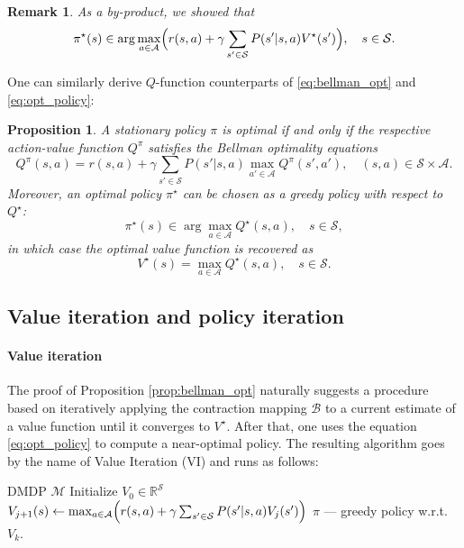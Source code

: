 \documentclass{article}
\numberwithin{equation}{section}
\newtheorem{proposition}{Proposition}
\newtheorem{remark}{Remark}
\newcommand{\cA}{\mathcal{A}}
\newcommand{\cM}{\mathcal{M}}
\newcommand{\cS}{\mathcal{S}}
\begin{document}
\begin{remark}
    As a by-product, we showed that
    \begin{equation}\label{eq:opt_policy}
        \pi^{\star}(s) \in \arg\max_{a\in\cA} \Bigl( r(s, a) + \gamma \sum_{s'\in\cS} P(s'|s,a) V^{\star}(s') \Bigr),
        \quad s\in\cS.
    \end{equation}
\end{remark}

One can similarly derive $Q$-function counterparts of \eqref{eq:bellman_opt} and \eqref{eq:opt_policy}:
\begin{proposition}
 A stationary policy $\pi$ is optimal if and only if the respective action-value function $Q^\pi$ satisfies the Bellman optimality equations
\begin{equation}\label{eq:bellman_optQ}
    Q^{\pi}(s,a) = r(s,a) + \gamma \sum_{s'\in\cS} P(s'|s,a) \max_{a'\in\cA} Q^\pi(s',a'), 
    \quad (s,a)\in\cS\times\cA.
\end{equation}
Moreover, an optimal policy $\pi^{\star}$ can be chosen as a greedy policy with respect to $Q^{\star}$:
\begin{equation}
\pi^{\star}(s) \in \arg\max_{a \in \cA} Q^{\star}(s,a), \quad s \in \cS,
\end{equation}
in which case the optimal value function is recovered as
\[
V^{\star}(s) = \max_{a \in \cA} Q^{\star}(s,a), \quad s \in \cS.
\]
\end{proposition}


\subsection{Value iteration and policy iteration}\label{subsec:vi_pi}

\paragraph{Value iteration}
The proof of Proposition \ref{prop:bellman_opt} naturally suggests a procedure based on iteratively applying the contraction mapping $\mathcal{B}$ to a current estimate of a value function until it converges to $V^{\star}$. After that, one uses the equation \eqref{eq:opt_policy} to compute a near-optimal policy. The resulting algorithm goes by the name of Value Iteration (VI) \citep{bellman1957markovian} and runs as follows:
\begin{algorithm}[H]
\caption{Value Iteration (VI)}
\label{alg:vi}
\begin{algorithmic}[1]
    \REQUIRE DMDP \(\cM\)
    \STATE Initialize \(V_0 \in \mathbb R^{\mathcal S}\)
            \STATE \(V_{j+1}(s) \gets \max_{a\in\cA} \Bigl( r(s,a) + \gamma \sum_{s'\in\cS} P(s'|s,a) V_j(s') \Bigr)\)
        \ENDFOR
        \ENDFOR
	\RETURN $\pi$ --- greedy policy w.r.t. \(V_{k}.\)
\end{algorithmic}
\end{algorithm}
\end{document}
